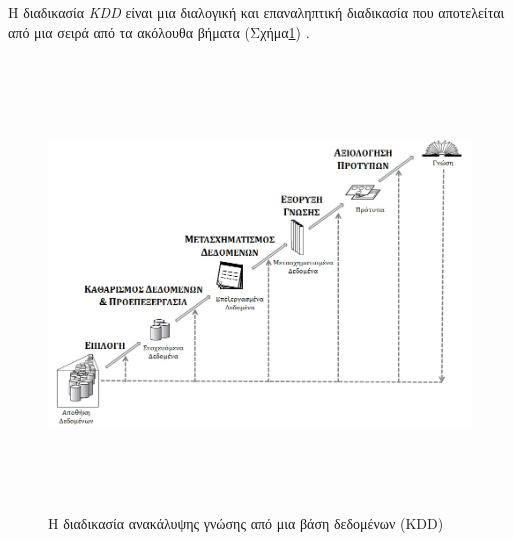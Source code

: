 \documentclass[12pt,twoside,openright]{report}
\begin{document}
Η διαδικασία \lt \emph{KDD} \gt είναι μια διαλογική και επαναληπτική διαδικασία που αποτελείται από μια σειρά από τα ακόλουθα βήματα (Σχήμα\ref{fig:KDDprocess}) \cite{vazirgiannis2005halkidi}.
\begin{figure}[H]
\centering
\includegraphics[height=12cm]{images/kdd_process}
\caption{Η διαδικασία ανακάλυψης γνώσης από μια βάση δεδομένων \lt (KDD) \gt}
\label{fig:KDDprocess}
\end{figure}
\end{document}
